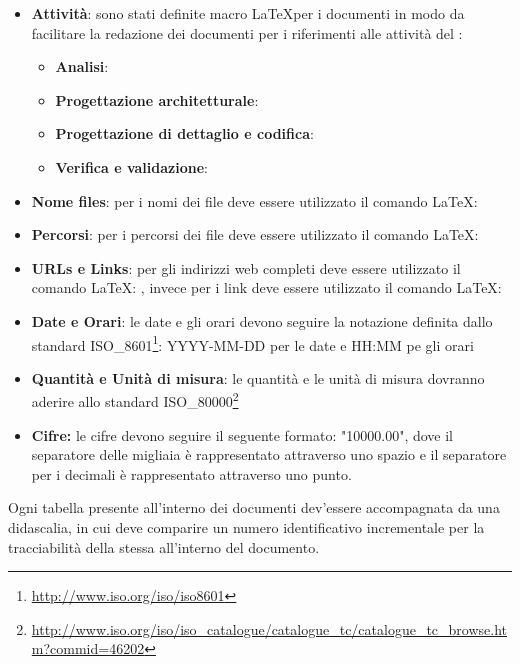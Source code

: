 \documentclass[12pt,a4paper]{article}
\begin{document}
\begin{itemize}
\begin{itemize}
		\item {}
	\end{itemize}
	\item \textbf{Attività}: sono stati definite macro  \LaTeX per i documenti in modo da facilitare la redazione dei documenti per i riferimenti alle attività del \PdP:
	\begin{itemize}
		\item \textbf{Analisi}: 
		\item \textbf{Progettazione architetturale}: 
		\item \textbf{Progettazione di dettaglio e codifica}: 
		\item \textbf{Verifica e validazione}: 
	\end{itemize}
\end{itemize}

\label{formati}
\begin{itemize}
	\item \textbf{Nome files}: per i nomi dei file deve essere utilizzato il comando \LaTeX: 
	\item  \textbf{Percorsi}: per i percorsi dei file deve essere utilizzato il comando \LaTeX: 
	\item \textbf{URLs e Links}:  per gli indirizzi web completi deve essere utilizzato il comando \LaTeX: , invece per i link deve essere utilizzato il comando \LaTeX: 
	\item \textbf{Date e Orari}: le date e gli orari devono seguire la notazione definita dallo standard ISO\_8601\footnote{\url{http://www.iso.org/iso/iso8601}}: YYYY-MM-DD per le date e HH:MM pe gli orari
	\item \textbf{Quantità e Unità di misura}: le quantità e le unità di misura dovranno aderire allo standard ISO\_80000\footnote{\url{http://www.iso.org/iso/iso_catalogue/catalogue_tc/catalogue_tc_browse.htm?commid=46202}}
	\item \textbf{Cifre:} le cifre devono seguire il seguente formato: "\num{10000.00}", dove il separatore delle migliaia è rappresentato attraverso uno spazio e il separatore per i decimali è rappresentato attraverso uno punto.
\end{itemize}

Ogni tabella presente all'interno dei documenti dev'essere accompagnata da una didascalia, in cui deve comparire un numero identificativo incrementale per la tracciabilità della stessa all'interno del documento.
\end{document}
